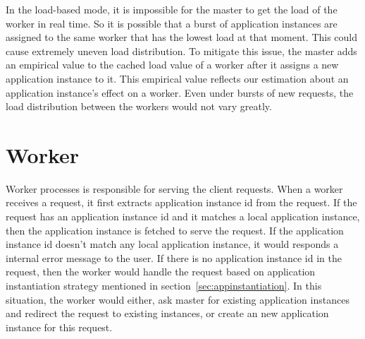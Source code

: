 In the load-based mode, it is impossible for the master to get the load of the
worker in real time. So it is possible that a burst of application instances are
assigned to the same worker that has the lowest load at that moment. This could
cause extremely uneven load distribution. To mitigate this issue, the master
adds an empirical value to the cached load value of a worker after it assigns a
new application instance to it. This empirical value reflects our estimation
about an application instance's  effect on a worker. Even under bursts of new
requests,  the load distribution between the workers would not vary greatly.


\section{Worker} 
\label{sec:worker}

Worker processes is responsible for serving the client requests. When a worker
receives a request, it first extracts application instance id from the request.
If the request has an application instance id and it matches a local application
instance, then the application instance is fetched to serve the request. If the
application instance id doesn't match any local application instance, it would
responds a internal error message to the user. If there is no application
instance id  in the request, then the worker would handle the request based on
application instantiation strategy mentioned in
section~\ref{sec:appinstantiation}. In this situation, the worker would either,
ask master for existing application instances and redirect the request to
existing instances, or create an new application instance for this request.



